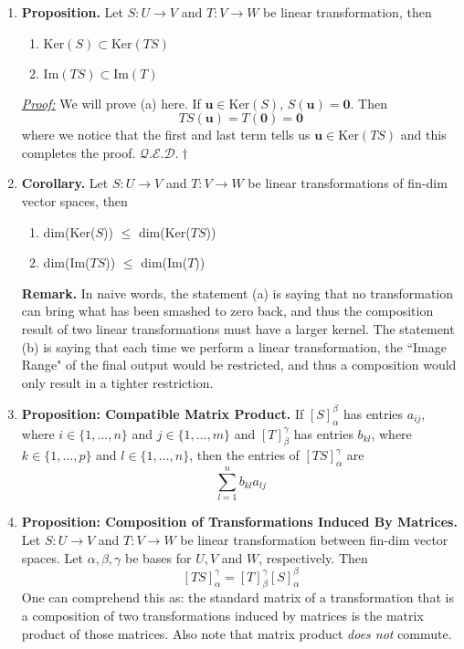 \documentclass[oneside, 12pt]{book}
\newcommand{\settag}[1]{\renewcommand{\theenumi}{#1}}
\newcommand{\qed}{\hfill $\mathcal{Q}.\mathcal{E}.\mathcal{D}.\dagger$}
\newcommand{\tbf}[1]{\textbf{#1}}
\newcommand{\tit}[1]{\textit{#1}}
\newcommand{\proof}{\tit{\underline{Proof:}}} %
\newcommand{\trans}[3]{$#1:#2\rightarrow{}#3$}
\newcommand{\para}[1]{\item \tbf{#1}}
\newcommand{\vu}{\mathbf{u}}
\newcommand{\vzero}{\mathbf{0}}
\begin{document}
\begin{enumerate}
    \settag{2.5.6}
    \para{Proposition.} Let \trans{S}{U}{V} and \trans{T}{V}{W} be linear transformation, then
    \begin{enumerate}
        \item $\text{Ker}(S)\subset \text{Ker}(TS)$
        \item $\text{Im}(TS)\subset \text{Im}(T)$
    \end{enumerate}
    \proof \newline
    We will prove (a) here. If $\vu \in \text{Ker}(S)$, $S(\vu) = \vzero$. Then 
    \begin{equation*}
        TS(\vu) = T(\vzero) = \vzero
    \end{equation*}
    where we notice that the first and last term tells us $\vu \in \text{Ker}(TS)$ and this completes the proof. \qed
    
    \settag{2.5.7}
    \para{Corollary.} Let \trans{S}{U}{V} and \trans{T}{V}{W} be linear transformations of fin-dim vector spaces, then
    \begin{enumerate}
        \item dim(Ker($S$)) $\leq$ dim(Ker($TS$))
        \item dim(Im($TS$)) $\leq$ dim(Im($T$))
    \end{enumerate}
    \tbf{Remark.} In naive words, the statement (a) is saying that no transformation can bring what has been smashed to zero back, and thus the composition result of two linear transformations must have a larger kernel. The statement (b) is saying that each time we perform a linear transformation, the ``Image Range" of the final output would be restricted, and thus a composition would only result in a tighter restriction.
    
    \settag{2.5.9}
    \para{Proposition: Compatible Matrix Product.} If $\left[S\right]_\alpha^\beta$ has entries $a_{ij}$, where $i\in \{1, \ldots, n\}$ and $j\in \{1, \ldots, m\}$ and $\left[T\right]_\beta^\gamma$ has entries $b_{kl}$, where $k\in \{1, \ldots, p\}$ and $l\in \{1, \ldots, n\}$, then the entries of $\left[TS\right]_\alpha^\gamma$ are 
    \begin{equation*}
        \sum_{l=1}^nb_{kl}a_{lj}
    \end{equation*}
    
    \settag{2.5.13}
    \para{Proposition: Composition of Transformations Induced By Matrices.} Let \trans{S}{U}{V} and \trans{T}{V}{W} be linear transformation between fin-dim vector spaces. Let $\alpha, \beta, \gamma$ be bases for $U, V$ and $W$, respectively. Then
    \begin{equation*}
        \left[TS\right]_\alpha^\gamma = \left[T\right]_\beta^\gamma \left[S\right]_\alpha^\beta
    \end{equation*}
    One can comprehend this as: the standard matrix of a transformation that is a composition of two transformations induced by matrices is the matrix product of those matrices. Also note that matrix product \tit{does not} commute.
    

\end{enumerate}
\end{document}
